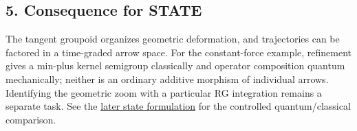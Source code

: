 \documentclass[11pt,a4paper]{article}
\begin{document}
\hypertarget{consequence-for-state}{%
\subsection{5. Consequence for STATE}\label{consequence-for-state}}

The tangent groupoid organizes geometric deformation, and trajectories
can be factored in a time-graded arrow space. For the constant-force
example, refinement gives a min-plus kernel semigroup classically and
operator composition quantum mechanically; neither is an ordinary
additive morphism of individual arrows. Identifying the geometric zoom
with a particular RG integration remains a separate task. See the
\href{groupoid-quantum-newton-states.md}{later state formulation} for
the controlled quantum/classical comparison.
\end{document}
